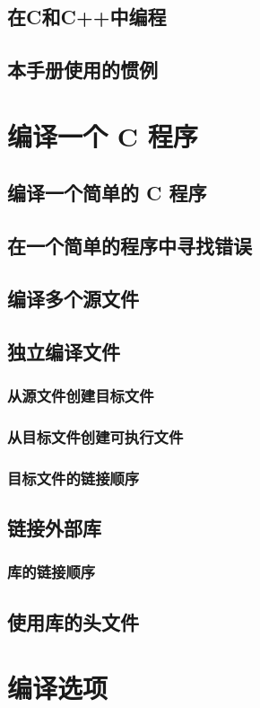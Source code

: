 \documentclass[lang=cn,12pt,newtx,scheme=chinese]{elegantbook}
\begin{document}
\section{在C和C++中编程}
\section{本手册使用的惯例}

\chapter{编译一个 C 程序}
\section{编译一个简单的 C 程序}
\section{在一个简单的程序中寻找错误}
\section{编译多个源文件}
\section{独立编译文件}
\subsection{从源文件创建目标文件}
\subsection{从目标文件创建可执行文件}
\subsection{目标文件的链接顺序}
\section{链接外部库}
\subsection{库的链接顺序}
\section{使用库的头文件}

\chapter{编译选项}
\end{document}
